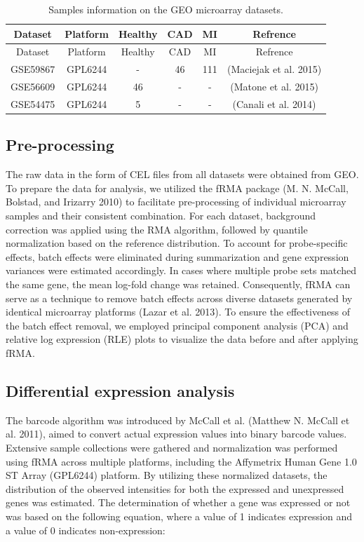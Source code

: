 \documentclass[
]{article}
\begin{document}
\begin{longtable}[]{@{}cccccc@{}}
\caption{Samples information on the GEO microarray
datasets.}\tabularnewline
\toprule()
Dataset & Platform & Healthy & CAD & MI & Refrence \\
\midrule()
\endfirsthead
\toprule()
Dataset & Platform & Healthy & CAD & MI & Refrence \\
\midrule()
\endhead
GSE59867 & GPL6244 & - & 46 & 111 & (Maciejak et al. 2015) \\
GSE56609 & GPL6244 & 46 & - & - & (Matone et al. 2015) \\
GSE54475 & GPL6244 & 5 & - & - & (Canali et al. 2014) \\
\bottomrule()
\end{longtable}

\hypertarget{pre-processing}{%
\subsection{Pre-processing}\label{pre-processing}}

The raw data in the form of CEL files from all datasets were obtained
from GEO. To prepare the data for analysis, we utilized the fRMA package
(M. N. McCall, Bolstad, and Irizarry 2010) to facilitate pre-processing
of individual microarray samples and their consistent combination. For
each dataset, background correction was applied using the RMA algorithm,
followed by quantile normalization based on the reference distribution.
To account for probe-specific effects, batch effects were eliminated
during summarization and gene expression variances were estimated
accordingly. In cases where multiple probe sets matched the same gene,
the mean log-fold change was retained. Consequently, fRMA can serve as a
technique to remove batch effects across diverse datasets generated by
identical microarray platforms (Lazar et al. 2013). To ensure the
effectiveness of the batch effect removal, we employed principal
component analysis (PCA) and relative log expression (RLE) plots to
visualize the data before and after applying fRMA.

\hypertarget{differential-expression-analysis}{%
\subsection{Differential expression
analysis}\label{differential-expression-analysis}}

The barcode algorithm was introduced by McCall et al. (Matthew N. McCall
et al. 2011), aimed to convert actual expression values into binary
barcode values. Extensive sample collections were gathered and
normalization was performed using fRMA across multiple platforms,
including the Affymetrix Human Gene 1.0 ST Array (GPL6244) platform. By
utilizing these normalized datasets, the distribution of the observed
intensities for both the expressed and unexpressed genes was estimated.
The determination of whether a gene was expressed or not was based on
the following equation, where a value of 1 indicates expression and a
value of 0 indicates non-expression:
\end{document}
